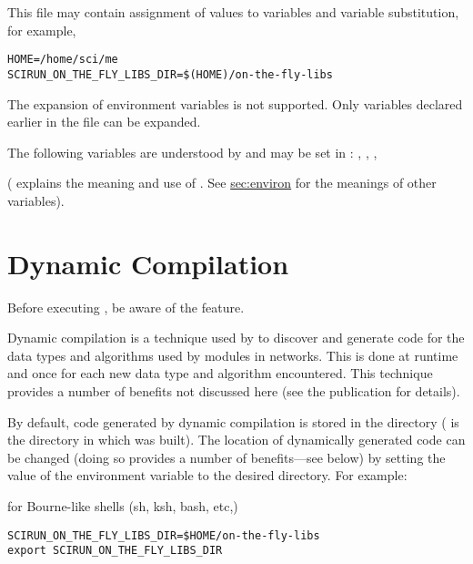This file may contain assignment of values to variables and variable
substitution, for example,

\begin{verbatim}
HOME=/home/sci/me
SCIRUN_ON_THE_FLY_LIBS_DIR=$(HOME)/on-the-fly-libs
\end{verbatim}

The expansion of environment variables is not supported.  Only
variables declared earlier in the file can be expanded.

The following variables are understood by \sr{} and may be set in
: ,
, ,

( explains the meaning and use
of .  See \hyperref{the
  previous section}{Section~}{}{sec:environ}
for the meanings of  other variables).

\section{Dynamic Compilation}
\label{sec:dyncomp}

Before executing \sr{},  be aware of the
 feature.

Dynamic compilation is a technique used by \sr{} to discover and
generate code for the data types and algorithms used by modules in
networks.  This is done at runtime and once for each new
data type and algorithm encountered.  This technique provides a number
of benefits not discussed here (see the publication 
for details).

By default, code generated by dynamic compilation is stored in the
directory  
( is the directory in which \sr{} was built).  The
location of dynamically generated code can be changed (doing so
provides a number of benefits---see below) by setting the value of the
environment variable  to the
desired directory. For example:

for Bourne-like shells (sh, ksh, bash, etc,)

\begin{verbatim}
SCIRUN_ON_THE_FLY_LIBS_DIR=$HOME/on-the-fly-libs
export SCIRUN_ON_THE_FLY_LIBS_DIR
\end{verbatim}

